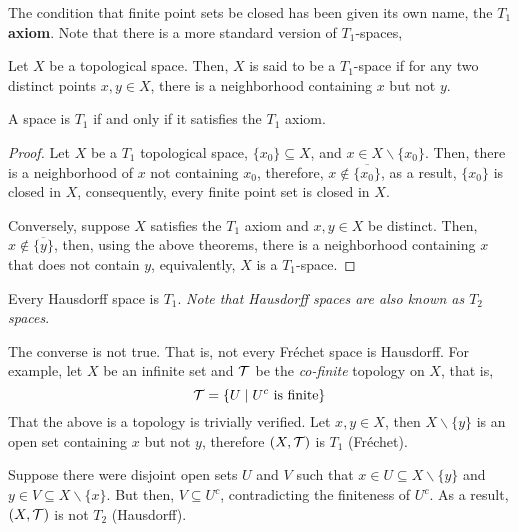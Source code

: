 The condition that finite point sets be closed has been given its own name, the \textbf{$T_1$ axiom}. Note that there is a more standard version of $T_1$-spaces, 
\begin{definition}[$T_1$-space]
    Let $X$ be a topological space. Then, $X$ is said to be a $T_1$-space if for any two distinct points $x,y\in X$, there is a neighborhood containing $x$ but not $y$.
\end{definition}

\begin{theorem}
    A space is $T_1$ if and only if it satisfies the $T_1$ axiom.
\end{theorem}
\begin{proof}
    Let $X$ be a $T_1$ topological space, $\{x_0\}\subseteq X$, and $x\in X\backslash\{x_0\}$. Then, there is a neighborhood of $x$ not containing $x_0$, therefore, $x\notin\overline{\{x_0\}}$, as a result, $\{x_0\}$ is closed in $X$, consequently, every finite point set is closed in $X$.

    Conversely, suppose $X$ satisfies the $T_1$ axiom and $x,y\in X$ be distinct. Then, $x\notin\overline{\{y\}}$, then, using the above theorems, there is a neighborhood containing $x$ that does not contain $y$, equivalently, $X$ is a $T_1$-space.
\end{proof}

\begin{corollary}
    Every Hausdorff space is $T_1$. \textit{Note that Hausdorff spaces are also known as $T_2$ spaces}.
\end{corollary}

\begin{mdframed}
    The converse is not true. That is, not every Fr\'echet space is Hausdorff. For example, let $X$ be an infinite set and $\mathcal{T}$ be the \textit{co-finite} topology on $X$, that is, 
    \begin{equation*}
        \mathcal{T} = \{U\mid \text{$U^c$ is finite}\}
    \end{equation*}
    That the above is a topology is trivially verified. Let $x,y\in X$, then $X\backslash\{y\}$ is an open set containing $x$ but not $y$, therefore $(X,\mathcal{T})$ is $T_1$ (Fr\'echet).

    Suppose there were disjoint open sets $U$ and $V$ such that $x\in U\subseteq X\backslash\{y\}$ and $y\in V\subseteq X\backslash\{x\}$. But then, $V\subseteq U^c$, contradicting the finiteness of $U^c$. As a result, $(X,\mathcal{T})$ is not $T_2$ (Hausdorff).
\end{mdframed}

